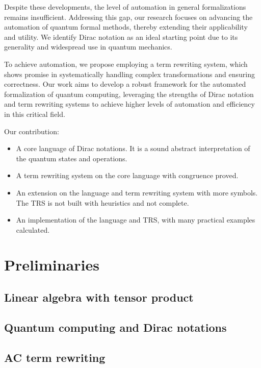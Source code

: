 \documentclass[manuscript, review, timestamp]{acmart}
\begin{document}
Despite these developments, the level of automation in general formalizations remains insufficient. Addressing this gap, our research focuses on advancing the automation of quantum formal methods, thereby extending their applicability and utility. We identify Dirac notation as an ideal starting point due to its generality and widespread use in quantum mechanics.

To achieve automation, we propose employing a term rewriting system, which shows promise in systematically handling complex transformations and ensuring correctness. Our work aims to develop a robust framework for the automated formalization of quantum computing, leveraging the strengths of Dirac notation and term rewriting systems to achieve higher levels of automation and efficiency in this critical field.

Our contribution:
\begin{itemize}
  \item A core language of Dirac notations. It is a sound abstract interpretation of the quantum states and operations. 
  \item A term rewriting system on the core language with congruence proved.
  \item An extension on the language and term rewriting system with more symbols. The TRS is not built with heuristics and not complete.
  \item An implementation of the language and TRS, with many practical examples calculated.
\end{itemize}



\section{Preliminaries}

\subsection{Linear algebra with tensor product}

\subsection{Quantum computing and Dirac notations}

\subsection{AC term rewriting}
\end{document}
